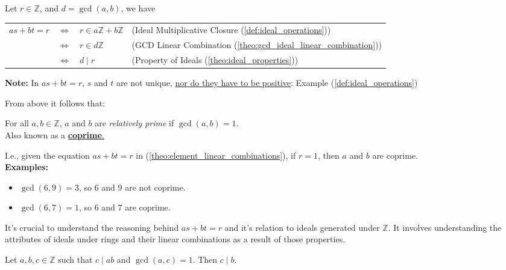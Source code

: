 \begin{Proof}

    Let $r\in\mathbb{Z}$, and $d=\gcd(a,b)$, we have
    
    \begin{center}

        \begin{tabular}{p{2cm} p{1cm} p{2cm} p{5.5cm}}
            $as + bt = r$ & $\Longleftrightarrow$ & $r \in a\mathbb{Z} + b\mathbb{Z}$ & (Ideal Multiplicative Closure (\ref{def:ideal_operations})) \\
            & $\Longleftrightarrow$ & $r \in d\mathbb{Z}$ & (GCD Linear Combination (\ref{theo:gcd_ideal_linear_combination})) \\
            & $\Longleftrightarrow$ & $d \mid r$ & (Property of Ideals (\ref{theo:ideal_properties})) \\
        \end{tabular}
    \end{center}
\end{Proof}
\begin{Note}
    \textbf{Note:} In $as + bt = r$, $s$ and $t$ are not unique, \underline{nor do they have to be positive}: Example (\ref{def:ideal_operations})
\end{Note}

\noindent
From above it follows that:

\begin{Def}

    For all \(a, b \in \mathbb{Z}\), \(a\) and \(b\) are \textit{relatively prime} if \(\gcd(a, b) = 1\).\\
    
    \noindent
    Also known as a \underline{\textbf{coprime}.}

\end{Def}
I.e., given the equation $as + bt = r$ in (\ref{theo:element_linear_combinations}), if $r=1$, then $a$ and $b$ are coprime.\\

\textbf{Examples:}
\begin{itemize}
    \item $\gcd(6,9)=3$, so $6$ and $9$ are not coprime.
    \item $\gcd(6,7)=1$, so $6$ and $7$ are coprime.
\end{itemize}

\begin{Tip}
    It's crucial to understand the reasoning behind $as+bt=r$ and it's relation to ideals generated under $\mathbb{Z}$.
    It involves understanding the attributes of ideals under rings and their linear combinations as a result of those properties.
\end{Tip}

\newpage 

\begin{theo}

    Let \( a, b, c \in \mathbb{Z} \) such that \( c \mid ab \) and \( \gcd(a, c) = 1 \). Then \( c \mid b \).
\end{theo}

